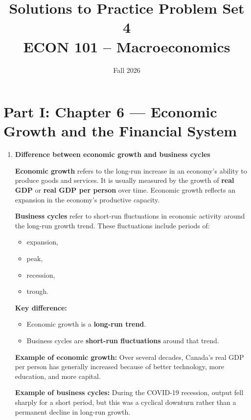 \documentclass[12pt]{article}
\title{Solutions to Practice Problem Set 4\\ \vspace{10pt} \large ECON 101 -- Macroeconomics}
\author{}
\date{Fall 2026}
\begin{document}
\maketitle

\section*{Part I: Chapter 6 — Economic Growth and the Financial System}

\begin{enumerate}[label=\textbf{\arabic*.}]

\item \textbf{Difference between economic growth and business cycles}

\textbf{Economic growth} refers to the long-run increase in an economy's ability to produce goods and services. It is usually measured by the growth of \textbf{real GDP} or \textbf{real GDP per person} over time. Economic growth reflects an expansion in the economy's productive capacity.

\textbf{Business cycles} refer to short-run fluctuations in economic activity around the long-run growth trend. These fluctuations include periods of:
\begin{itemize}
    \item expansion,
    \item peak,
    \item recession,
    \item trough.
\end{itemize}

\textbf{Key difference:}
\begin{itemize}
    \item Economic growth is a \textbf{long-run trend}.
    \item Business cycles are \textbf{short-run fluctuations} around that trend.
\end{itemize}

\textbf{Example of economic growth:} Over several decades, Canada's real GDP per person has generally increased because of better technology, more education, and more capital.

\textbf{Example of business cycles:} During the COVID-19 recession, output fell sharply for a short period, but this was a cyclical downturn rather than a permanent decline in long-run growth.

\vspace{0.5em}


\end{enumerate}
\end{document}
